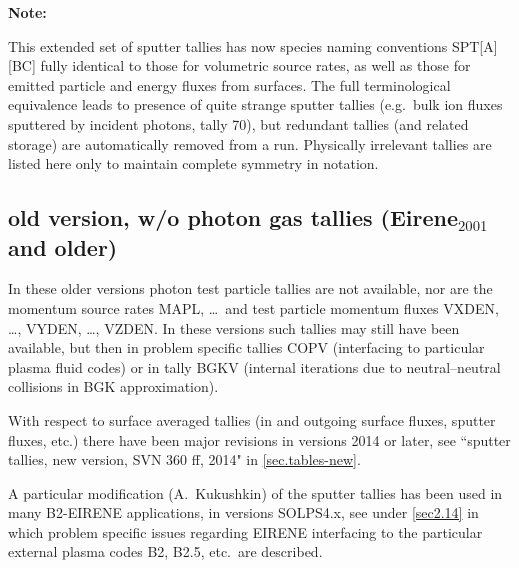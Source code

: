 \begin{landscape}
  \textbf{Note:} 

  This extended set of sputter tallies has now species naming conventions
  SPT[A][BC] fully identical to those for volumetric source rates, as well as
  those for emitted particle and energy fluxes from surfaces.
  The full terminological equivalence leads to presence of quite strange sputter
  tallies (e.g.\ bulk ion fluxes sputtered by incident photons, tally 70), but
  redundant tallies (and related storage) are automatically removed from a run.
  Physically irrelevant tallies are listed here only to maintain complete
  symmetry in notation.
\end{landscape}

\newpage

\subsection{old version, w/o photon gas tallies (Eirene\texorpdfstring{$_{2001}
    $}{2001} and older)}\label{sec.tables-old} 

In these older versions photon test particle tallies are not available, nor are
the momentum source rates MAPL, \dots\ and test particle momentum fluxes VXDEN,
\dots, VYDEN, \dots, VZDEN.
In these versions such tallies may still have been available, but then in
problem specific tallies COPV (interfacing to particular plasma fluid codes) or
in tally BGKV (internal iterations due to neutral--neutral collisions in
\ac{BGK} approximation).

\medskip

With respect to surface averaged tallies (in and outgoing surface fluxes,
sputter fluxes, etc.) there have been major revisions in versions 2014 or
later, see ``sputter tallies, new version, SVN 360 ff, 2014" in
\cref{sec.tables-new}.

A particular modification (A.~Kukushkin) of the sputter tallies has been used
in many B2-EIRENE applications, in versions SOLPS4.x, see under \cref{sec2.14}
in which problem specific issues regarding EIRENE interfacing to the particular
external plasma codes B2, B2.5, etc.\ are described.

